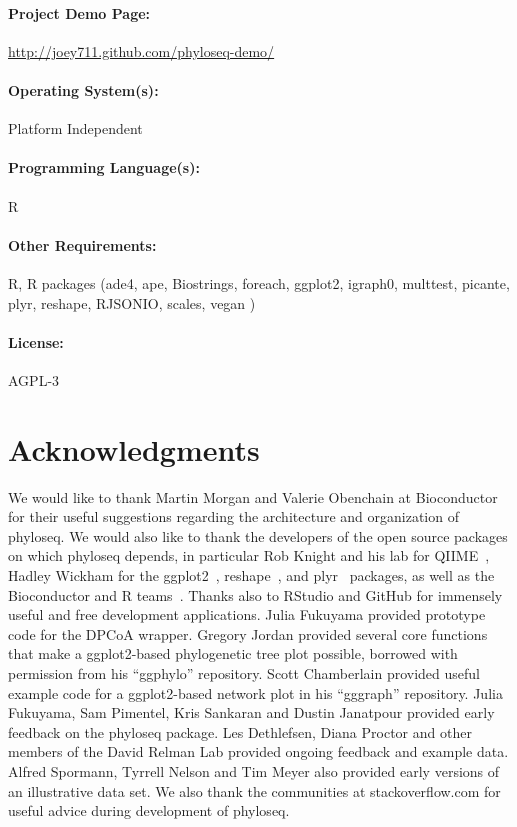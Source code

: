 \documentclass[10pt]{article}\usepackage{graphicx, color}
\newcommand{\R}{{\textsf{R}}}
\begin{document}
\paragraph*{Project Demo Page:} \url{http://joey711.github.com/phyloseq-demo/} 
\paragraph*{Operating System(s):} Platform Independent
\paragraph*{Programming Language(s):} \R{}
\paragraph*{Other Requirements:} \R{}, \R{} packages
(ade4, ape, Biostrings, foreach, ggplot2, igraph0, multtest, picante, plyr, reshape, RJSONIO, scales, vegan )
\paragraph*{License:} AGPL-3
  

\section*{Acknowledgments}
We would like to thank Martin Morgan and Valerie Obenchain
at Bioconductor for their useful suggestions regarding
the architecture and organization of phyloseq.
We would also like to thank the developers of the open source packages
on which phyloseq depends,
in particular 
Rob Knight and his lab for QIIME~\cite{caporaso2010qiime}, 
Hadley Wickham for the ggplot2~\cite{ggplot2}, reshape~\cite{reshape}, and plyr~\cite{plyr} packages,
as well as 
the Bioconductor and \R{} teams~\cite{Bioconductor,Rlanguage}.
Thanks also to RStudio and GitHub for
immensely useful and free development applications.
Julia Fukuyama provided prototype code for the DPCoA wrapper.
Gregory Jordan provided several core functions that make a 
ggplot2-based phylogenetic tree plot possible,
borrowed with permission from his ``ggphylo'' repository.
Scott Chamberlain provided useful example code for a 
ggplot2-based network plot in his ``gggraph'' repository.
Julia Fukuyama, Sam Pimentel, Kris Sankaran and Dustin Janatpour
provided early feedback on the phyloseq package. 
Les Dethlefsen, Diana Proctor and other members of the David Relman Lab 
provided ongoing feedback and example data. 
Alfred Spormann, Tyrrell Nelson and Tim Meyer also provided
early versions of an illustrative data set. 
We also thank the communities at stackoverflow.com
for useful advice during development of phyloseq.
\end{document}
